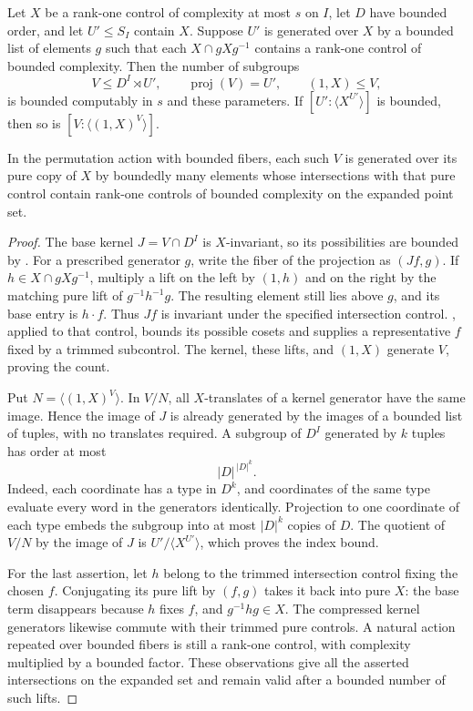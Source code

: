 \begin{lemma}\label{n:lifting}
Let $X$ be a rank-one control of complexity at most $s$ on $I$, let $D$
have bounded order, and let $U'\le S_I$ contain $X$.  Suppose $U'$ is
generated over $X$ by a bounded
list of elements $g$ such that each $X\cap gXg^{-1}$ contains a rank-one
control of bounded complexity.  Then the number of subgroups
\[
 V\le D^I\rtimes U',\qquad \operatorname{proj}(V)=U',
 \qquad (1,X)\le V,
\]
is bounded computably in $s$ and these parameters.  If
$[U':\langle X^{U'}\rangle]$ is bounded, then so is
$[V:\langle(1,X)^V\rangle]$.

In the permutation action with bounded fibers, each such $V$ is generated
over its pure copy of $X$ by boundedly many elements whose intersections
with that pure control contain rank-one controls of bounded complexity
on the expanded point set.
\end{lemma}

\begin{proof}
The base kernel $J=V\cap D^I$ is $X$-invariant, so its possibilities are
bounded by .  For a prescribed generator $g$, write
the fiber of the projection as $(Jf,g)$.  If
$h\in X\cap gXg^{-1}$, multiply a lift on the left by $(1,h)$ and on
the right by the matching pure lift of $g^{-1}h^{-1}g$.  The resulting
element still lies above $g$, and its base entry is $h\cdot f$.
Thus $Jf$ is invariant under the specified intersection control.
, applied to that control, bounds its possible
cosets and supplies a representative $f$ fixed by a trimmed subcontrol.
The kernel, these lifts, and $(1,X)$ generate $V$, proving the count.

Put $N=\langle(1,X)^V\rangle$.  In $V/N$, all $X$-translates of a
kernel generator have the same image.  Hence the image of $J$ is already
generated by the images of a bounded list of tuples, with no translates
required.  A subgroup of $D^I$ generated by $k$ tuples has order at most
\begin{equation}\label{n:base-order}
 |D|^{\,|D|^k}.
\end{equation}
Indeed, each coordinate has a type in $D^k$, and coordinates of the same
type evaluate every word in the generators identically.  Projection to
one coordinate of each type embeds the subgroup into at most $|D|^k$
copies of $D$.  The quotient of $V/N$ by the image of $J$ is
$U'/\langle X^{U'}\rangle$, which proves the index bound.

For the last assertion, let $h$ belong to the trimmed intersection
control fixing the chosen $f$.  Conjugating its pure lift by $(f,g)$
takes it back into pure $X$: the base term disappears because $h$ fixes
$f$, and $g^{-1}hg\in X$.  The compressed kernel generators likewise
commute with their trimmed pure controls.  A natural action repeated
over bounded fibers is still a rank-one control, with complexity
multiplied by a bounded factor.  These observations give all the
asserted intersections on the expanded set and remain valid after a
bounded number of such lifts.
\end{proof}

